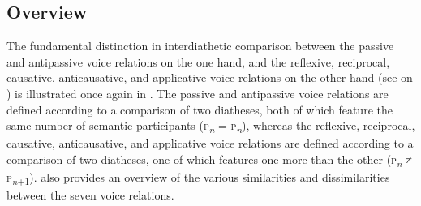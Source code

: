 \subsection{Overview} \label{def:overview}
The fundamental distinction in interdiathetic comparison between the passive and antipassive voice relations on the one hand, and the reflexive, reciprocal, causative, anticausative, and applicative voice relations on the other hand (see  on \pageref{fig:ch2:diathetic-relations}) is illustrated once again in . The passive and antipassive voice relations are defined according to a comparison of two diatheses, both of which feature the same number of semantic participants (\textsc{p}\textsubscript{\textit{n}} = \textsc{p}\textsubscript{\textit{n}}), whereas the reflexive, reciprocal, causative, anticausative, and applicative voice relations are defined according to a comparison of two diatheses, one of which features one  more than the other (\textsc{p}\textsubscript{\textit{n}} ≠ \textsc{p}\textsubscript{\textit{n}+1}).  also provides an overview of the various similarities and dissimilarities between the seven voice relations. 

